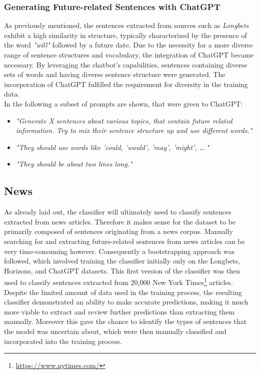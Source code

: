 \documentclass[12pt,oneside,bibtotoc,liststotoc]{scrbook}
\begin{document}
\subsubsection{Generating Future-related Sentences with ChatGPT}
As previously mentioned, the sentences extracted from sources such as \textit{Longbets} exhibit a high similarity in structure, typically characterized by the presence of the word \textit{"will"} followed by a future date. Due to the necessity for a more diverse range of sentence structures and vocabulary, the integration of ChatGPT became necessary. By leveraging the chatbot's capabilities, sentences containing diverse sets of words and having diverse sentence structure were generated. The incorporation of ChatGPT fulfilled the requirement for diversity in the training data. \\

In the following a subset of prompts are shown, that were given to ChatGPT:
\begin{itemize}
  \item \textit{"Generate X sentences about various topics, that contain future related information. Try to mix their sentence structure up and use different words."}
  \item \textit{"They should use words like 'could, 'would', 'may', 'might', …."}
  \item \textit{"They should be about two lines long."}
\end{itemize}

\subsection{News}
As already laid out, the classifier will ultimately need to classify sentences extracted from news articles. Therefore it makes sense for the dataset to be primarily composed of sentences originating from a news corpus. Manually searching for and extracting future-related sentences from news articles can be very time-consuming however. Consequently a bootstrapping approach was followed, which involved training the classifier initially only on the Longbets, Horizons, and ChatGPT datasets. This first version of the classifier was then used to classify sentences extracted from 20,000 New York Times\footnote{\url{https://www.nytimes.com/}} articles.
Despite the limited amount of data used in the training process, the resulting classifier demonstrated an ability to make accurate predictions, making it much more viable to extract and review further predictions than extracting them manually. Moreover this gave the chance to identify the types of sentences that the model was uncertain about, which were then manually classified and incorporated into the training process.
\end{document}
